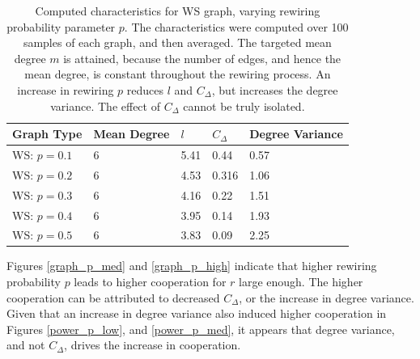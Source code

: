 \FloatBarrier
\begin{table}[!h]
\begin{center}
\begin{tabular}{|l|l|l|l|l|}
\hline
Graph Type & Mean Degree & $l$ & $C_\Delta$ & Degree Variance \\ \hline
WS: $p=0.1$        & 6        & 5.41                         & 0.44                  & 0.57           \\ \hline
WS: $p=0.2$        &6           & 4.53                         & 0.316                   & 1.06               \\ \hline
WS: $p=0.3$        &6           & 4.16                         & 0.22                   & 1.51               \\ \hline
WS: $p=0.4$       & 6        & 3.95                         & 0.14                  & 1.93           \\ \hline
WS: $p=0.5$         & 6           & 3.83                         & 0.09                   & 2.25            \\ \hline
\end{tabular}
\caption{Computed characteristics for WS graph, varying rewiring probability parameter $p$. The characteristics were computed over 100 samples of each graph, and then averaged. The targeted mean degree $m$ is attained, because the number of edges, and hence the mean degree, is constant throughout the rewiring process. An increase in rewiring $p$ reduces $l$ and $C_\Delta$, but increases the degree variance. The effect of $C_\Delta$ cannot be truly isolated. } \label{graph_stats_WS}
\end{center}
\end{table}
\FloatBarrier

\FloatBarrier
 

\FloatBarrier
Figures \ref{graph_p_med} and \ref{graph_p_high} indicate that higher rewiring probability $p$ leads to higher cooperation for $r$ large enough. The higher cooperation can be attributed to decreased $C_\Delta$, or the increase in degree variance. Given that an increase in degree variance also induced higher cooperation in Figures \ref{power_p_low}, and \ref{power_p_med}, it appears that degree variance, and not $C_\Delta$, drives the increase in cooperation.  \\

